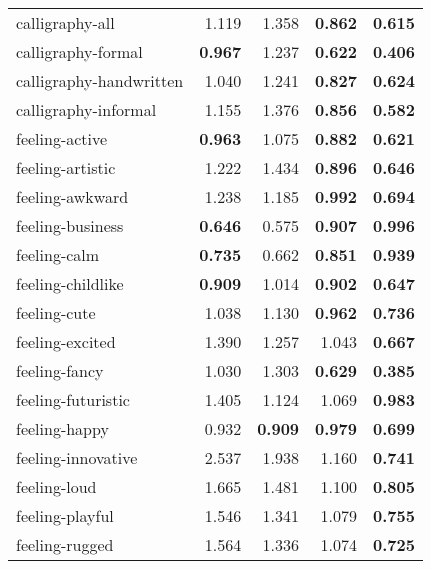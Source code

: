 \begin{longtable}{|l|r|r|r|r|}
calligraphy-all           & 1.119          & 1.358          & \textbf{0.862} & \textbf{0.615} \\
calligraphy-formal        & \textbf{0.967} & 1.237          & \textbf{0.622} & \textbf{0.406} \\
calligraphy-handwritten   & 1.040          & 1.241          & \textbf{0.827} & \textbf{0.624} \\
calligraphy-informal      & 1.155          & 1.376          & \textbf{0.856} & \textbf{0.582} \\
feeling-active            & \textbf{0.963} & 1.075          & \textbf{0.882} & \textbf{0.621} \\
feeling-artistic          & 1.222          & 1.434          & \textbf{0.896} & \textbf{0.646} \\
feeling-awkward           & 1.238          & 1.185          & \textbf{0.992} & \textbf{0.694} \\
feeling-business          & \textbf{0.646} & 0.575          & \textbf{0.907} & \textbf{0.996} \\
feeling-calm              & \textbf{0.735} & 0.662          & \textbf{0.851} & \textbf{0.939} \\
feeling-childlike         & \textbf{0.909} & 1.014          & \textbf{0.902} & \textbf{0.647} \\
feeling-cute              & 1.038          & 1.130          & \textbf{0.962} & \textbf{0.736} \\
feeling-excited           & 1.390          & 1.257          & 1.043          & \textbf{0.667} \\
feeling-fancy             & 1.030          & 1.303          & \textbf{0.629} & \textbf{0.385} \\
feeling-futuristic        & 1.405          & 1.124          & 1.069          & \textbf{0.983} \\
feeling-happy             & 0.932          & \textbf{0.909} & \textbf{0.979} & \textbf{0.699} \\
feeling-innovative        & 2.537          & 1.938          & 1.160          & \textbf{0.741} \\
feeling-loud              & 1.665          & 1.481          & 1.100          & \textbf{0.805} \\
feeling-playful           & 1.546          & 1.341          & 1.079          & \textbf{0.755} \\
feeling-rugged            & 1.564          & 1.336          & 1.074          & \textbf{0.725} \\

\end{longtable}
